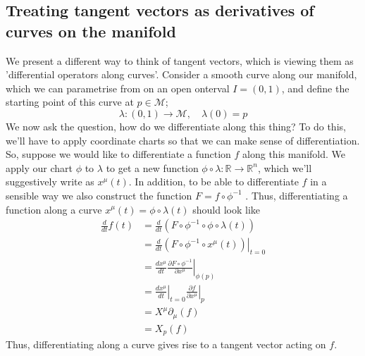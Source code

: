 \subsection{Treating tangent vectors as derivatives of curves on the manifold}
We present a different way to think of tangent vectors, which is viewing them as 'differential operators along curves'. Consider a smooth curve along our manifold, which we can parametrise from on an open onterval $I = (0 , 1)$, and define the starting point of this curve at $p \in \mathcal { M} $; 
\[ 
\lambda: ( 0, 1) \rightarrow \mathcal{ M}, \quad \lambda( 0 ) = p 
\]  
We now ask the question, how do we differentiate along this thing? To do this, we'll have to apply coordinate charts so that we can make sense of differentiation. So, suppose we would like to differentiate a function $f$ along this manifold. We apply our chart $\phi$ to $\lambda$ to get a new function $ \phi \circ \lambda : \mathbb{R} \rightarrow \mathbb{R}^n$, which we'll suggestively write as $x^\mu ( t) $. In addition, to be able to differentiate $f$ in a sensible way we also construct the function $F = f \circ \phi^ { -1} $ . Thus, differentiating a function along a curve $x^\mu ( t) = \phi \circ \lambda ( t) $ should look like 
\begin{align*} 
\frac{ d}{ dt} f(t) &= \frac{ d}{ dt} \left( F \circ \phi^{ -1} \circ \phi \circ \lambda (t) \right) \\
& = \left. \frac{d}{ dt} \left( F \circ \phi^{ -1} \circ x^\mu ( t) \right) \right\vert_{ t = 0} \\
&= \frac{ dx^\mu}{ dt} \left. \frac{ \partial F \circ \phi^{ -1} }{ \partial x^\mu } \right\vert_{ \phi( p ) } \\
&= \left. \frac{dx^\mu}{dt} \right\vert_{t =0} \left. \frac{ \partial f}{ \partial x^\mu } \right\vert_{ p } \\
&= X^\mu \partial_\mu (f) \\	
&= X_p (f)
\end{align*} 
Thus, differentiating along a curve gives rise to a tangent vector acting on $f$. 

